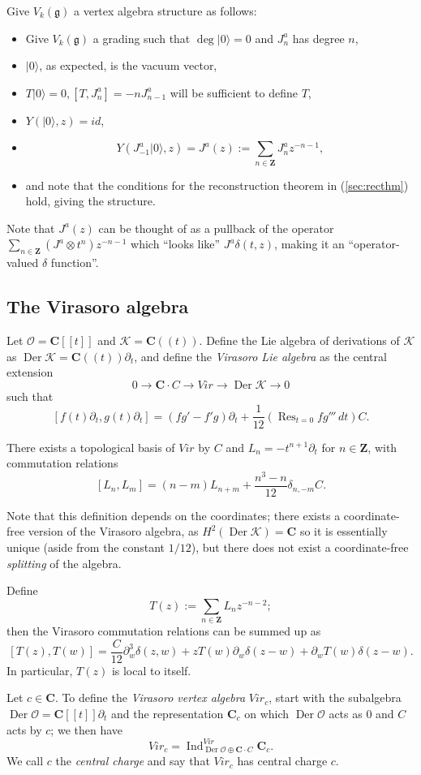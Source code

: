 \documentclass{article}
\newcommand{\CC}{\mathbold{C}}
\newcommand{\ZZ}{\mathbold{Z}}
\newcommand{\vac}{|0\rangle}
\newcommand{\Oo}{\mathcal{O}}
\newcommand{\Kk}{\mathcal{K}}
\newcommand{\gf}{\mathfrak{g}}
\DeclareMathOperator{\Res}{Res}
\DeclareMathOperator{\Ind}{Ind}
\DeclareMathOperator{\Der}{Der}
\begin{document}
Give $V_k(\gf)$ a vertex algebra structure as follows:
\begin{itemize}
\item Give $V_k(\gf)$ a grading such that $\deg \vac=0$ and $J^a_n$ has degree $n$,
\item $\vac$, as expected, is the vacuum vector,
\item $T\vac=0, [T,J^a_n]=-nJ^a_{n-1}$ will be sufficient to define $T$,
\item $Y(\vac,z)=id$,
\item \[Y(J^a_{-1}\vac,z)=J^a(z):=\sum_{n \in \ZZ}J^a_nz^{-n-1}, \]
\item and note that the conditions for the reconstruction theorem in (\ref{sec:recthm}) hold, giving the structure.
\end{itemize}
Note that $J^a(z)$ can be thought of as a pullback of the operator $\sum_{n \in \ZZ}(J^a \otimes t^n)z^{-n-1}$ which ``looks like'' $J^a\delta(t,z)$, making it an ``operator-valued $\delta$ function''.
\subsection{The Virasoro algebra}
\label{sec:virasoro}
Let $\Oo=\CC[[t]]$ and $\Kk=\CC((t))$.  Define the Lie algebra of derivations of $\Kk$ as $\Der \Kk = \CC((t)) \partial_t$, and define the \textit{Virasoro Lie algebra} as the central extension
\[0 \rightarrow \CC \cdot C \rightarrow Vir \rightarrow \Der \Kk \rightarrow 0 \]
such that
\[[f(t)\partial_t,g(t)\partial_t]=(fg'-f'g)\partial_t+\frac{1}{12}(\Res_{t=0}fg'''\,dt)C. \]

There exists a topological basis of $Vir$ by $C$ and $L_n=-t^{n+1}\partial_t$ for $n \in \ZZ$, with commutation relations
\[[L_n,L_m]=(n-m)L_{n+m}+\frac{n^3-n}{12} \delta_{n,-m}C. \]

Note that this definition depends on the coordinates; there exists a coordinate-free version of the Virasoro algebra, as $H^2(\Der \Kk)=\CC$ so it is essentially unique (aside from the constant $1/12$), but there does not exist a coordinate-free \textit{splitting} of the algebra.

Define
\[T(z) := \sum_{n \in \ZZ}L_nz^{-n-2}; \]
then the Virasoro commutation relations can be summed up as
\[[T(z),T(w)]=\frac{C}{12}\partial^3_w \delta(z,w)+zT(w)\partial_w\delta(z-w)+\partial_wT(w)\delta(z-w). \]
In particular, $T(z)$ is local to itself.

Let $c \in \CC$. To define the \textit{Virasoro vertex algebra} $Vir_c$, start with the subalgebra $\Der \Oo=\CC[[t]]\partial_t$ and the representation $\CC_c$ on which $\Der \Oo$ acts as $0$ and $C$ acts by $c$; we then have
\[Vir_c=\Ind_{\Der \Oo \oplus \CC \cdot C}^{Vir}\CC_c. \]
We call $c$ the \textit{central charge} and say that $Vir_c$ has central charge $c$.
\end{document}
